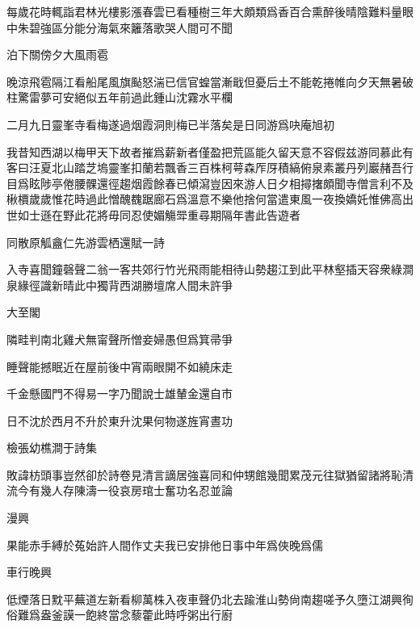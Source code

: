 \documentclass{zhvt-classic-Miya}
\begin{document}
每歲花時輒詣君林光樓影漲春雲已看種樹三年大頗類爲香百合熏醉後晴陰難料量眼中朱碧強區分能分海氣來籬落歌哭人間可不聞

\begin{fw}泊下關傍夕大風雨雹\end{fw}

晚涼飛雹隔江看船尾風旗颭怒湍已信官蝗當漸戢但憂后土不能乾捲帷向夕天無暑破柱驚雷夢可安絕似五年前過此鍾山沈霧水平欄

\begin{fw}二月九日靈峯寺看梅遂過烟霞洞則梅已半落矣是日同游爲吷庵旭初\end{fw}

我昔知西湖以梅甲天下故者摧爲薪新者僅盈把荒區能久留天意不容假兹游同慕此有客曰汪夏北山踏芝塢靈峯扣蘭若飄香三百株柯萼森厏厊積縞俯泉素叢丹列巖赭吾行目爲眩陟亭倦腰髁還徑趨烟霞餘春已傾瀉豈因來游人日夕相撏撦頗聞寺僧言利不及楸檟歲歲惟花時過此憎醜䰩踞廊石爲溫意不樂他捨何當遣東風一夜換嬌奼惟佛高出世如士遜在野此花將毋同忍使媚觴斝重尋期隔年書此告遊者

\begin{fw}同散原觚盦仁先游雲栖還賦一詩\end{fw}

入寺喜聞鐘磬聲二翁一客共郊行竹光飛雨能相待山勢趨江到此平林壑插天容衆綠澗泉緣徑識新晴此中獨背西湖勝壇席人間未許爭

\begin{fw}大至閣\end{fw}

隣畦判南北雞犬無甯聲所憎妾婦愚但爲箕帚爭

睡聲能撼眠近在屋前後中宵兩眼開不如繞床走

千金懸國門不得易一字乃聞說士雄輦金還自市

日不沈於西月不升於東升沈果何物遂旌宵晝功

\begin{fw}檢張幼樵澗于詩集\end{fw}

敗諱枋頭事豈然卻於詩卷見清言謫居強喜同和仲甥館幾聞累茂元往獄猶留諸將恥清流今有幾人存陳濤一役哀房琯士奮功名忍並論

\begin{fw}漫興\end{fw}

果能赤手縛於菟始許人間作丈夫我已安排他日事中年爲俠晚爲儒

\begin{fw}車行晚興\end{fw}

低煙落日黕平蕪道左新看柳萬株入夜車聲仍北去踰淮山勢尙南趨嗟予久墮江湖興徇俗難爲盎釜謨一飽終當念藜藿此時呼粥出行廚
\end{document}
